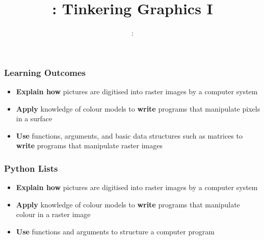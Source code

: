 \usepackage{../../beamerthemeFalmouthGamesAcademy}
\usepackage{multimedia}
\graphicspath{ {../../} }


\usepackage[normalem]{ulem}
\usepackage{wasysym}

\usepackage{pdfpages}

\usetikzlibrary{arrows,automata}







\title{\sessionnumber: Tinkering Graphics I}
\subtitle{\modulecode: \moduletitle}

\frame{\titlepage} 

\begin{frame}
	\frametitle{Learning Outcomes}
	\begin{itemize}
		\item \textbf{Explain how} pictures are digitised into raster images by a computer system
		\item \textbf{Apply} knowledge of colour models to \textbf{write} programs that manipulate pixels in a surface
		\item \textbf{Use} functions, arguments, and basic data structures such as matrices to \textbf{write} programs that manipulate raster images
	\end{itemize}
\end{frame}


\begin{frame}
	\frametitle{Python Lists}
	\begin{itemize}
		\item \textbf{Explain how} pictures are digitised into raster images by a computer system
		\item \textbf{Apply} knowledge of colour models to \textbf{write} programs that manipulate colour in a raster image
		\item \textbf{Use} functions and arguments to structure a computer program
	\end{itemize}
\end{frame}

